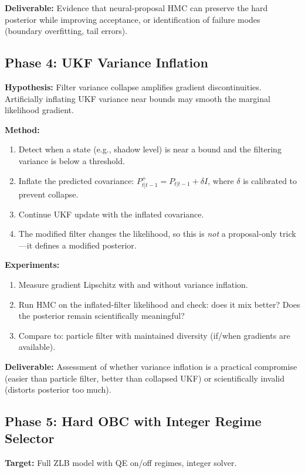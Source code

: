 \textbf{Deliverable:} Evidence that neural-proposal HMC can preserve the hard
posterior while improving acceptance, or identification of failure modes
(boundary overfitting, tail errors).

\subsection{Phase 4: UKF Variance Inflation}

\textbf{Hypothesis:} Filter variance collapse amplifies gradient
discontinuities. Artificially inflating UKF variance near bounds may smooth
the marginal likelihood gradient.

\textbf{Method:}
\begin{enumerate}
  \item Detect when a state (e.g., shadow level) is near a bound and the
    filtering variance is below a threshold.
  \item Inflate the predicted covariance: $P_{t|t-1}^+ = P_{t|t-1} + \delta I$,
    where $\delta$ is calibrated to prevent collapse.
  \item Continue UKF update with the inflated covariance.
  \item The modified filter changes the likelihood, so this is \emph{not} a
    proposal-only trick—it defines a modified posterior.
\end{enumerate}

\textbf{Experiments:}
\begin{enumerate}
  \item Measure gradient Lipschitz with and without variance inflation.
  \item Run HMC on the inflated-filter likelihood and check: does it mix
    better? Does the posterior remain scientifically meaningful?
  \item Compare to: particle filter with maintained diversity (if/when
    gradients are available).
\end{enumerate}

\textbf{Deliverable:} Assessment of whether variance inflation is a practical
compromise (easier than particle filter, better than collapsed UKF) or
scientifically invalid (distorts posterior too much).

\subsection{Phase 5: Hard OBC with Integer Regime Selector}

\textbf{Target:} Full ZLB model with QE on/off regimes, integer solver.

